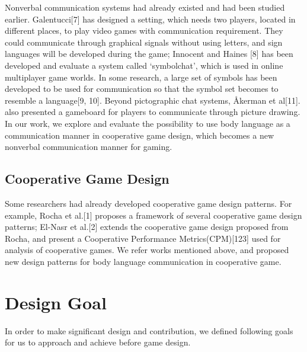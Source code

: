 \documentclass{sigchi}
\begin{document}
Nonverbal communication systems had already existed and had been studied earlier. 
Galentucci[7] has designed a setting, which needs two players, located in different places, to play video games with communication requirement.
They could communicate through graphical signals without using letters, and sign languages will be developed during the game; 
Innocent and Haines [8] has been developed and evaluate a system called ‘symbolchat’, which is used in online multiplayer game worlds. In some research, a large set of symbols has been developed to be used for communication so that the symbol set becomes to resemble a language[9, 10]. Beyond pictographic chat systems, Åkerman et al[11]. also presented a gameboard for players to communicate through picture drawing. In our work, we explore and evaluate the possibility to use body language as a communication manner in cooperative game design, which becomes a new nonverbal communication manner for gaming.

\subsection{Cooperative Game Design}
Some researchers had already developed cooperative game design patterns. For example, Rocha et al.[1] proposes a framework of several cooperative game design patterns; El-Nasr et al.[2] extends the cooperative game design proposed from Rocha, and present a Cooperative Performance Metrics(CPM)[123] used for analysis of cooperative games. We refer works mentioned above, and proposed new design patterns for body language communication in cooperative game.

\section{Design Goal}
In order to make significant design and contribution, we defined following goals for us to approach and achieve before game design.
\end{document}
